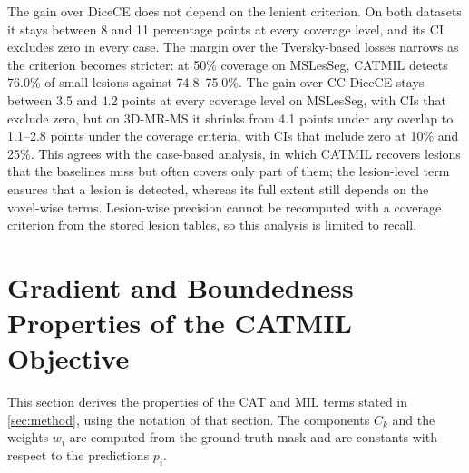 The gain over DiceCE does not depend on the lenient criterion. On both
datasets it stays between 8 and 11 percentage points at every coverage
level, and its CI excludes zero in every case. The margin over the
Tversky-based losses narrows as the criterion becomes stricter: at 50\%
coverage on MSLesSeg, CATMIL detects 76.0\% of small lesions against
74.8--75.0\%. The gain over CC-DiceCE stays between 3.5 and 4.2 points at
every coverage level on MSLesSeg, with CIs that exclude zero, but on
3D-MR-MS it shrinks from 4.1 points under any overlap to 1.1--2.8 points
under the coverage criteria, with CIs that include zero at 10\% and 25\%.
This agrees with the case-based analysis, in which CATMIL
recovers lesions that the baselines miss but often covers only part of
them; the lesion-level term ensures that a lesion is detected, whereas its
full extent still depends on the voxel-wise terms. Lesion-wise precision
cannot be recomputed with a coverage criterion from the stored lesion
tables, so this analysis is limited to recall.

\section{Gradient and Boundedness Properties of the CATMIL Objective}
\label{appendix:catmil-properties}

This section derives the properties of the CAT and MIL terms stated in
\cref{sec:method}, using the notation of that section. The components $C_k$
and the weights $w_i$ are computed from the ground-truth mask and are
constants with respect to the predictions $p_i$.

